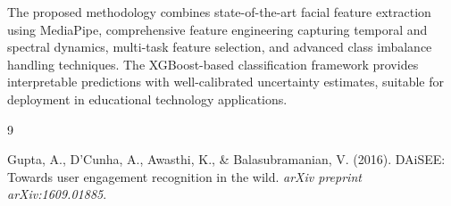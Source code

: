 \documentclass[11pt,a4paper]{article}
\begin{document}
The proposed methodology combines state-of-the-art facial feature extraction using MediaPipe, comprehensive feature engineering capturing temporal and spectral dynamics, multi-task feature selection, and advanced class imbalance handling techniques. The XGBoost-based classification framework provides interpretable predictions with well-calibrated uncertainty estimates, suitable for deployment in educational technology applications.

\begin{thebibliography}{9}

  Gupta, A., D'Cunha, A., Awasthi, K., \& Balasubramanian, V. (2016).
  DAiSEE: Towards user engagement recognition in the wild.
  \textit{arXiv preprint arXiv:1609.01885}.

\end{thebibliography}
\end{document}
